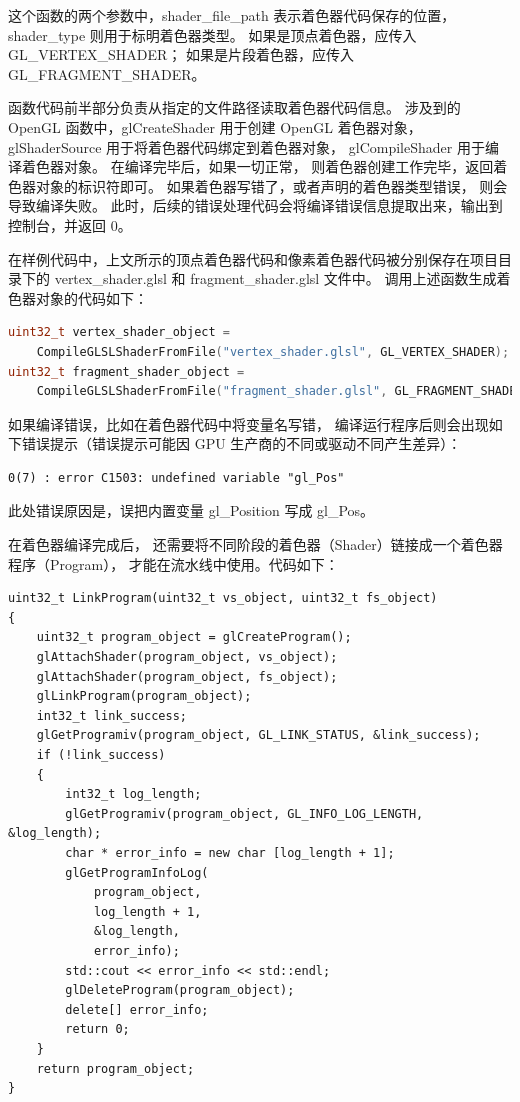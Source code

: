 \documentclass[fontset=windows]{ctexart}
\begin{document}
这个函数的两个参数中，shader\_file\_path 表示着色器代码保存的位置，
shader\_type 则用于标明着色器类型。
如果是顶点着色器，应传入 GL\_VERTEX\_SHADER；
如果是片段着色器，应传入 GL\_FRAGMENT\_SHADER。

函数代码前半部分负责从指定的文件路径读取着色器代码信息。
涉及到的 OpenGL 函数中，glCreateShader 用于创建 OpenGL 着色器对象，
glShaderSource 用于将着色器代码绑定到着色器对象，
glCompileShader 用于编译着色器对象。
在编译完毕后，如果一切正常，
则着色器创建工作完毕，返回着色器对象的标识符即可。
如果着色器写错了，或者声明的着色器类型错误，
则会导致编译失败。
此时，后续的错误处理代码会将编译错误信息提取出来，输出到控制台，并返回 0。

在样例代码中，上文所示的顶点着色器代码和像素着色器代码被分别保存在项目目录下的
 vertex\_shader.glsl 和 fragment\_shader.glsl 文件中。
调用上述函数生成着色器对象的代码如下：

\begin{lstlisting}[language=c++]
uint32_t vertex_shader_object =
    CompileGLSLShaderFromFile("vertex_shader.glsl", GL_VERTEX_SHADER);
uint32_t fragment_shader_object =
    CompileGLSLShaderFromFile("fragment_shader.glsl", GL_FRAGMENT_SHADER);
\end{lstlisting}

如果编译错误，比如在着色器代码中将变量名写错，
编译运行程序后则会出现如下错误提示（错误提示可能因 GPU 生产商的不同或驱动不同产生差异）：

\begin{lstlisting}
0(7) : error C1503: undefined variable "gl_Pos"
\end{lstlisting}

此处错误原因是，误把内置变量 gl\_Position 写成 gl\_Pos。

在着色器编译完成后，
还需要将不同阶段的着色器（Shader）链接成一个着色器程序（Program），
才能在流水线中使用。代码如下：

\begin{lstlisting}
uint32_t LinkProgram(uint32_t vs_object, uint32_t fs_object)
{
    uint32_t program_object = glCreateProgram();
    glAttachShader(program_object, vs_object);
    glAttachShader(program_object, fs_object);
    glLinkProgram(program_object);
    int32_t link_success;
    glGetProgramiv(program_object, GL_LINK_STATUS, &link_success);
    if (!link_success)
    {
        int32_t log_length;
        glGetProgramiv(program_object, GL_INFO_LOG_LENGTH, &log_length);
        char * error_info = new char [log_length + 1];
        glGetProgramInfoLog(
            program_object,
            log_length + 1,
            &log_length,
            error_info);
        std::cout << error_info << std::endl;
        glDeleteProgram(program_object);
        delete[] error_info;
        return 0;
    }
    return program_object;
}
\end{lstlisting}
\end{document}
